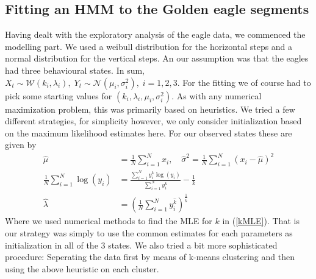 \subsection{Fitting an HMM to the Golden eagle segments}\label{hmmGoldenEagle}
Having dealt with the exploratory analysis of the eagle data, we commenced the modelling part. We used a weibull distribution for the horizontal steps and a normal distribution for the vertical steps. An our assumption was that the eagles had three behavioural states. In sum, $X_t \sim \mathcal{W}(k_i, \lambda_i), \; Y_t \sim \mathcal{N}(\mu_i, \sigma_i^2), \; i = 1,2,3$. For the fitting we of course  had to pick some starting values for $(k_i, \lambda_i, \mu_i, \sigma_i^2)$. As with any numerical maximization problem, this was primarily based on heuristics. We tried a few different strategies, for simplicity however, we only consider initialization based on the maximum likelihood estimates here. For our observed states these are given by\cite{Cohen1965}
\begin{align}
    \hat{\mu} &= \frac{1}{N}\sum_{i = 1}^N x_i, \quad \hat{\sigma}^2 = \frac{1}{N}\sum_{i = 1}^N \left(x_i-\hat{\mu}\right)^2\\
    \frac{1}{N}\sum_{i = 1}^N \log(y_i)&= \frac{\sum_{i = 1}^N y_i^k\log(y_i)}{\sum_{i = 1}^N y_i^k} - \frac{1}{k} \label{kMLE} \\  \hat{\lambda} &= \left(\frac{1}{N} \sum_{i = 1}^N y_i^{\hat{k}}\right)^{\frac{1}{\hat{k}}}
\end{align}
Where we used numerical methods \cite{RLang} to find the MLE for $k$ in (\ref{kMLE}). That is our strategy was simply to use the common estimates for each parameters as initialization in all of the $3$ states. We also tried a bit more sophisticated procedure: Seperating the data first by means of k-means clustering \cite{RLang} and then using the above heuristic on each cluster.
